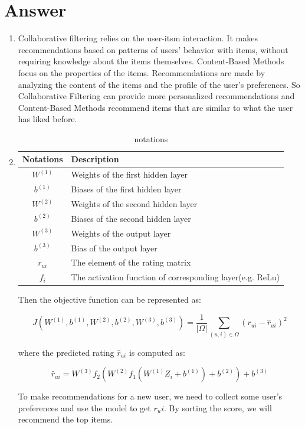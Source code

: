 \documentclass[
	12pt, %
]{fphw}
\begin{document}
\section*{Answer}
\begin{enumerate}
\item Collaborative filtering  relies on the user-itsm interaction. It makes recommendations based on patterns of users' behavior with items, without requiring knowledge about the items themselves. Content-Based Methods focus on the properties of the items. Recommendations are made by analyzing the content of the items and the profile of the user's preferences. So Collaborative Filtering can provide more personalized recommendations and Content-Based  Methods  recommend items that are similar to what the user has liked before.
\item \begin{table}[h]
	\centering
	\begin{tabular}{|c|l|}
	\hline
	\textbf{Notations} & \textbf{Description} \\
	\hline
	\( W^{(1)} \) & Weights of the first hidden layer \\
	\( b^{(1)} \) & Biases of the first hidden layer \\
	\( W^{(2)} \) & Weights of the second hidden layer \\
	\( b^{(2)} \) & Biases of the second hidden layer \\
	\( W^{(3)} \) & Weights of the output layer \\
	\( b^{(3)} \) & Bias of the output layer \\
	\( r_{ui} \)  & The element of the rating matrix \\
	\( f_i \)  & The activation function of corresponding layer(e.g. ReLu) \\
	\hline
	
	\end{tabular}
	\caption{notations}
	\label{tab:parameters}
	\end{table}
	Then the objective function can be represented as:
	
\begin{equation}
	J(W^{(1)}, b^{(1)}, W^{(2)}, b^{(2)}, W^{(3)}, b^{(3)}) = \frac{1}{|\Omega|} \sum_{(u,i)\in\Omega} (r_{ui} - \hat{r}_{ui})^2
	\end{equation}
	
	where the predicted rating \( \hat{r}_{ui} \) is computed as:
	
	\begin{equation}
	\hat{r}_{ui} = W^{(3)} f_2\left(W^{(2)} f_1\left(W^{(1)} Z_i + b^{(1)}\right) + b^{(2)}\right) + b^{(3)}
	\end{equation}

	To make recommendations for a new user, we need to collect some user's preferences and use the model to get $r_ui$. By sorting the score, we will recommend the top items.

\end{enumerate}
\end{document}
